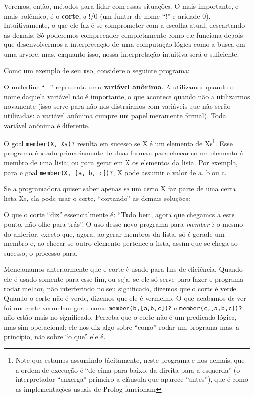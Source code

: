 \documentclass{article}
\theoremstyle{remark}
\begin{document}
Veremos, então, métodos para lidar com essas situações. O mais importante, e mais polêmico, é o \textbf{corte}, o !/0 (um funtor de nome ``!'' e aridade 0). Intuitivamente, o que ele faz é se comprometer com a escolha atual, descartando as demais. Só poderemos compreender completamente como ele funciona depois que desenvolvermos a interpretação de uma computação lógica como a busca em uma árvore, mas, enquanto isso, nossa interpretação intuitiva será o suficiente.

Como um exemplo de seu uso, considere o seguinte programa:



O underline ``\_'' representa uma \textbf{variável anônima}. A utilizamos quando o nome daquela variável não é importante, o que acontece quando não a utilizarmos novamente (isso serve para não nos distrairmos com variáveis que não serão utilizadas: a variável anônima cumpre um papel meramente formal). Toda variável anônima é diferente.

O goal {\tt member(X, Xs)?} resulta em sucesso se X é um elemento de Xs\footnote{Note que estamos assumindo tácitamente, neste programa e nos demais, que a ordem de execução é ``de cima para baixo, da direita para a esquerda'' (o interpretador ``enxerga'' primeiro a cláusula que aparece ``antes''), que é como as implementações usuais de Prolog funcionam}. Esse programa é usado primariamente de duas formas: para checar se um elemento é membro de uma lista; ou para gerar em X os elementos da lista. Por exemplo, para o goal {\tt member(X, [a, b, c])?}, X pode assumir o valor de a, b ou c.

Se a programadora quiser saber apenas se um certo X faz parte de uma certa lista Xs, ela pode usar o corte, ``cortando'' as demais soluções:



O que o corte ``diz'' essencialmente é: ``Tudo bem, agora que chegamos a este ponto, não olhe para trás''. O uso desse novo programa para \textit{member} é o mesmo do anterior, exceto que, agora, ao gerar membros da lista, só é gerado um membro e, ao checar se outro elemento pertence a lista, assim que se chega ao sucesso, o processo para.

Mencionamos anteriormente que o corte é usado para fins de eficiência. Quando ele é usado somente para esse fim, ou seja, se ele só serve para fazer o programa rodar melhor, não interferindo no seu significado, dizemos que o corte é verde.
Quando o corte não é verde, dizemos que ele é vermelho. O que acabamos de ver foi um corte vermelho: goals como {\tt member(b,[a,b,c])?} e {\tt member(c,[a,b,c])?} não estão mais no significado. Perceba que o corte não é um predicado lógico, mas sim operacional: ele nos diz algo sobre ``como'' rodar um programa mas, a princípio, não sobre ``o que'' ele é.
\end{document}
